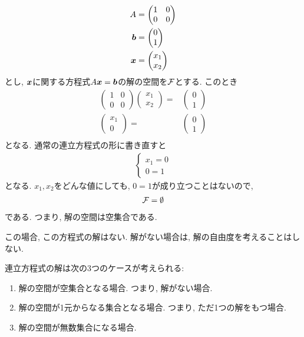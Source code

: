 \begin{example}
  \begin{align*}
    A&=\begin{pmatrix}1&0\\0&0\end{pmatrix}\\
    \boldsymbol{b}&=\begin{pmatrix}0\\1\end{pmatrix}\\
    \boldsymbol{x}&=\begin{pmatrix}x_1\\x_2\end{pmatrix}
  \end{align*}
  とし,
  $\boldsymbol{x}$に関する方程式$A\boldsymbol{x}=\boldsymbol{b}$の解の空間を$\mathcal{F}$とする.
  このとき
  \begin{align*}
    \begin{pmatrix}1&0\\0&0\end{pmatrix}
      \begin{pmatrix}x_1\\x_2\end{pmatrix}=&
        \begin{pmatrix}0\\1\end{pmatrix}\\
          \begin{pmatrix}x_1\\0\end{pmatrix}=&
            \begin{pmatrix}0\\1\end{pmatrix}\\
  \end{align*}
  となる.
  通常の連立方程式の形に書き直すと
  \begin{align*}
    \begin{cases}
      x_1=0\\
      0=1
    \end{cases}
  \end{align*}
  となる.
  $x_1,x_2$をどんな値にしても, $0=1$が成り立つことはないので,
  \begin{align*}
    \mathcal{F}=\emptyset
  \end{align*}
  である. つまり, 解の空間は空集合である.

  この場合, この方程式の解はない.
  解がない場合は, 解の自由度を考えることはしない.
\end{example}
\begin{remark}
連立方程式の解は次の3つのケースが考えられる:
\begin{enumerate}
  \item 解の空間が空集合となる場合. つまり, 解がない場合.
  \item 解の空間が1元からなる集合となる場合.  つまり, ただ1つの解をもつ場合.
  \item 解の空間が無数集合になる場合.
\end{enumerate}
\end{remark}

